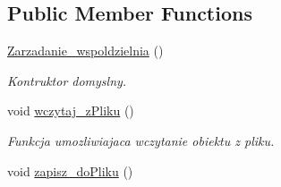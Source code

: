 \subsection*{Public Member Functions}
\begin{DoxyCompactItemize}
\item 
\hypertarget{class_zarzadanie__wspoldzielnia_a76e6f4fae35734588b3a66bf5b9a8b8a}{}\hyperlink{class_zarzadanie__wspoldzielnia_a76e6f4fae35734588b3a66bf5b9a8b8a}{Zarzadanie\+\_\+wspoldzielnia} ()\label{class_zarzadanie__wspoldzielnia_a76e6f4fae35734588b3a66bf5b9a8b8a}

\begin{DoxyCompactList}\small\item\em Kontruktor domyslny. \end{DoxyCompactList}\item 
\hypertarget{class_zarzadanie__wspoldzielnia_ac004989293c215e3cf877f109b5e96a0}{}void \hyperlink{class_zarzadanie__wspoldzielnia_ac004989293c215e3cf877f109b5e96a0}{wczytaj\+\_\+z\+Pliku} ()\label{class_zarzadanie__wspoldzielnia_ac004989293c215e3cf877f109b5e96a0}

\begin{DoxyCompactList}\small\item\em Funkcja umozliwiajaca wczytanie obiektu z pliku. \end{DoxyCompactList}\item 
\hypertarget{class_zarzadanie__wspoldzielnia_a54e43549dbff31055cbc81050908a895}{}void \hyperlink{class_zarzadanie__wspoldzielnia_a54e43549dbff31055cbc81050908a895}{zapisz\+\_\+do\+Pliku} ()\label{class_zarzadanie__wspoldzielnia_a54e43549dbff31055cbc81050908a895}


\end{DoxyCompactItemize}

